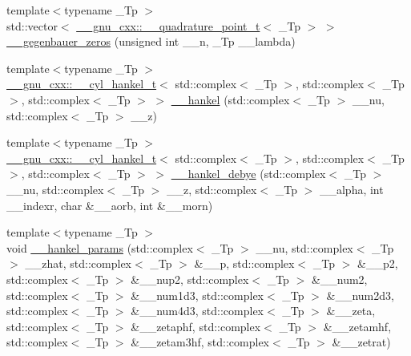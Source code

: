\begin{DoxyCompactItemize}
\item 
{\footnotesize template$<$typename \+\_\+\+Tp $>$ }\\std\+::vector$<$ \hyperlink{struct____gnu__cxx_1_1____quadrature__point__t}{\+\_\+\+\_\+gnu\+\_\+cxx\+::\+\_\+\+\_\+quadrature\+\_\+point\+\_\+t}$<$ \+\_\+\+Tp $>$ $>$ \hyperlink{namespacestd_1_1____detail_ae009135e8f2dfd9e97694c778a15ce08}{\+\_\+\+\_\+gegenbauer\+\_\+zeros} (unsigned int \+\_\+\+\_\+n, \+\_\+\+Tp \+\_\+\+\_\+lambda)
\item 
{\footnotesize template$<$typename \+\_\+\+Tp $>$ }\\\hyperlink{struct____gnu__cxx_1_1____cyl__hankel__t}{\+\_\+\+\_\+gnu\+\_\+cxx\+::\+\_\+\+\_\+cyl\+\_\+hankel\+\_\+t}$<$ std\+::complex$<$ \+\_\+\+Tp $>$, std\+::complex$<$ \+\_\+\+Tp $>$, std\+::complex$<$ \+\_\+\+Tp $>$ $>$ \hyperlink{namespacestd_1_1____detail_a0346301fb5eb7faa659064335675f8c6}{\+\_\+\+\_\+hankel} (std\+::complex$<$ \+\_\+\+Tp $>$ \+\_\+\+\_\+nu, std\+::complex$<$ \+\_\+\+Tp $>$ \+\_\+\+\_\+z)
\item 
{\footnotesize template$<$typename \+\_\+\+Tp $>$ }\\\hyperlink{struct____gnu__cxx_1_1____cyl__hankel__t}{\+\_\+\+\_\+gnu\+\_\+cxx\+::\+\_\+\+\_\+cyl\+\_\+hankel\+\_\+t}$<$ std\+::complex$<$ \+\_\+\+Tp $>$, std\+::complex$<$ \+\_\+\+Tp $>$, std\+::complex$<$ \+\_\+\+Tp $>$ $>$ \hyperlink{namespacestd_1_1____detail_a4051efdcdf6d1ab4a4b26c1c9f6752b6}{\+\_\+\+\_\+hankel\+\_\+debye} (std\+::complex$<$ \+\_\+\+Tp $>$ \+\_\+\+\_\+nu, std\+::complex$<$ \+\_\+\+Tp $>$ \+\_\+\+\_\+z, std\+::complex$<$ \+\_\+\+Tp $>$ \+\_\+\+\_\+alpha, int \+\_\+\+\_\+indexr, char \&\+\_\+\+\_\+aorb, int \&\+\_\+\+\_\+morn)
\item 
{\footnotesize template$<$typename \+\_\+\+Tp $>$ }\\void \hyperlink{namespacestd_1_1____detail_aff42671a79cd3852a57752f79c82f8da}{\+\_\+\+\_\+hankel\+\_\+params} (std\+::complex$<$ \+\_\+\+Tp $>$ \+\_\+\+\_\+nu, std\+::complex$<$ \+\_\+\+Tp $>$ \+\_\+\+\_\+zhat, std\+::complex$<$ \+\_\+\+Tp $>$ \&\+\_\+\+\_\+p, std\+::complex$<$ \+\_\+\+Tp $>$ \&\+\_\+\+\_\+p2, std\+::complex$<$ \+\_\+\+Tp $>$ \&\+\_\+\+\_\+nup2, std\+::complex$<$ \+\_\+\+Tp $>$ \&\+\_\+\+\_\+num2, std\+::complex$<$ \+\_\+\+Tp $>$ \&\+\_\+\+\_\+num1d3, std\+::complex$<$ \+\_\+\+Tp $>$ \&\+\_\+\+\_\+num2d3, std\+::complex$<$ \+\_\+\+Tp $>$ \&\+\_\+\+\_\+num4d3, std\+::complex$<$ \+\_\+\+Tp $>$ \&\+\_\+\+\_\+zeta, std\+::complex$<$ \+\_\+\+Tp $>$ \&\+\_\+\+\_\+zetaphf, std\+::complex$<$ \+\_\+\+Tp $>$ \&\+\_\+\+\_\+zetamhf, std\+::complex$<$ \+\_\+\+Tp $>$ \&\+\_\+\+\_\+zetam3hf, std\+::complex$<$ \+\_\+\+Tp $>$ \&\+\_\+\+\_\+zetrat)

\end{DoxyCompactItemize}
